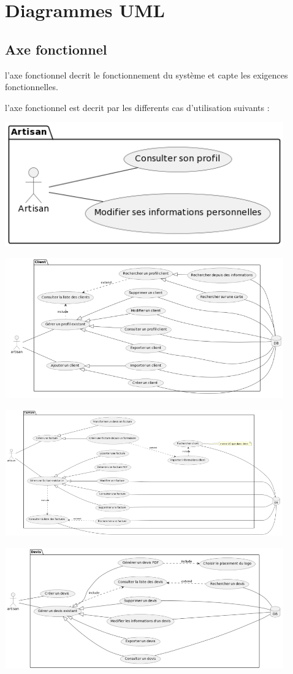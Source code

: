 \documentclass[a4paper,10pt]{scrartcl}
\begin{document}
\section{Diagrammes UML}
\subsection{Axe fonctionnel}
l'axe fonctionnel decrit le fonctionnement du système et capte les exigences fonctionnelles.

l'axe fonctionnel est decrit par les differents cas d'utilisation suivants : 

\centerline{\includegraphics[width=12cm]{artisan.png}}
\centerline{\includegraphics[width=12cm]{client.png}}
\centerline{\includegraphics[width=12cm]{facture.png}}
\centerline{\includegraphics[width=12cm]{devis.png}}
\end{document}
